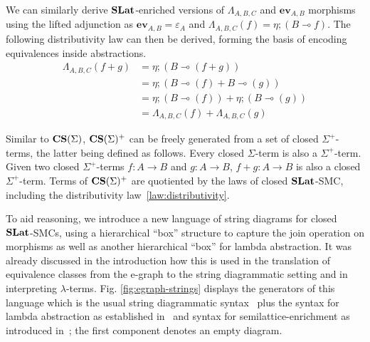We can similarly derive $\mathbf{SLat}$-enriched versions of  $\Lambda_{A,B,C}$ and $\textbf{ev}_{A,B}$ morphisms using the lifted adjunction as $\textbf{ev}_{A,B} = \varepsilon_{A}$ and $\Lambda_{A,B,C}(f) = \eta; (B \multimap{} f)$.
The following distributivity law can then be derived, forming the basis of encoding equivalences inside abstractions.
\begin{equation}
	\begin{aligned}
		\Lambda_{A,B,C}(f + g) & = \eta;(B \multimap (f + g))                      \\
		                       & = \eta;(B \multimap (f) + B \multimap (g))        \\
		                       & = \eta;(B \multimap (f)) + \eta;(B \multimap (g)) \\
		                       & = \Lambda_{A,B,C}(f) + \Lambda_{A,B,C}(g)
	\end{aligned}
\end{equation}
\label{law:distributivity}

Similar to $\mathbf{CS}(\Sigma)$, $\mathbf{CS}(\Sigma)^{+}$ can be freely generated from a set of closed $\Sigma^{+}$-terms, the latter being defined as follows.
Every closed $\Sigma$-term is also a $\Sigma^{+}$-term.
Given two closed $\Sigma^{+}$-terms $f : A \to B$ and $g : A \to B$, $f + g : A \to B$ is also a closed $\Sigma^{+}$-term.
Terms of $\mathbf{CS}(\Sigma)^{+}$ are quotiented by the laws of closed $\mathbf{SLat}$-SMC, including the distributivity law~\ref{law:distributivity}.

To aid reasoning, we introduce a new language of string diagrams for closed $\mathbf{SLat}$-SMCs, using a hierarchical ``box'' structure to capture the join operation on morphisms as well as another hierarchical ``box'' for lambda abstraction.
It was already discussed in the introduction how this is  used in the translation of equivalence classes from the e-graph to the string diagrammatic setting and in interpreting $\lambda$-terms.
Fig. \ref{fig:egraph-strings} displays the generators of this language which is the usual string diagrammatic syntax~\cite{Selinger_2010} plus the syntax for lambda abstraction as established in~\cite{ghica2024stringdiagramslambdacalculifunctional} and syntax for semilattice-enrichment as introduced in~\cite{ghica2024equivalencehypergraphsegraphsmonoidal}; the first component denotes an empty diagram.


